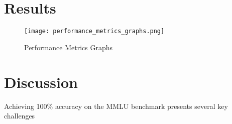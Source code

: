 \documentclass[journal]{IEEEtran}
\begin{document}
\section{Results}
\begin{figure}[htbp]
\centerline{\texttt{[image: performance\_metrics\_graphs.png]}}
\caption{Performance Metrics Graphs}
\label{fig:performance_metrics}
\end{figure}

\section{Discussion}
Achieving 100\% accuracy on the MMLU benchmark presents several key challenges
\end{document}
